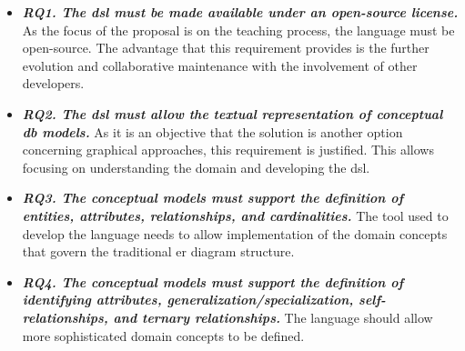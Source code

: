 \begin{itemize}

\item\textit{\textbf{RQ1. The \ac{dsl} must be made available under an open-source license.}}
As the focus of the proposal is on the teaching process, the language must be open-source.
The advantage that this requirement provides is the further evolution and collaborative maintenance with the involvement of other developers.

\item\textit{\textbf{RQ2. The \ac{dsl} must allow the textual representation of conceptual \ac{db} models.}}
As it is an objective that the solution is another option concerning graphical approaches, this requirement is justified.
This allows focusing on understanding the domain and developing the \ac{dsl}.

\item\textit{\textbf{RQ3. The conceptual models must support the definition of entities, attributes, relationships, and cardinalities.}}
The tool used to develop the language needs to allow implementation of the domain concepts that govern the traditional \ac{er} diagram structure.

\item\textit{\textbf{RQ4. The conceptual models must support the definition of identifying attributes, generalization/specialization, self-relationships, and ternary relationships.}}
The language should allow more sophisticated domain concepts to be defined.


\end{itemize}
